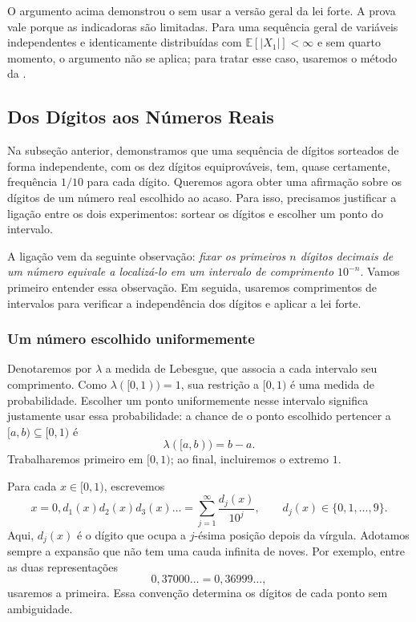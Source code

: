 \documentclass[12pt,portuguese]{article}
\theoremstyle{definition}
\theoremstyle{plainexercise}
\theoremstyle{starredexercise}
\theoremstyle{definition}
\begin{document}
O argumento acima demonstrou o  sem usar a versão geral da lei
forte. A prova vale porque as indicadoras são limitadas. Para uma sequência
geral de variáveis independentes e identicamente distribuídas com
$\mathbb{E}[|X_1|]<\infty$ e sem quarto momento, o argumento não se aplica;
para tratar esse caso, usaremos o método da
.

\subsection{Dos Dígitos aos Números Reais}\label{subsec:digitos-reais}

Na subseção anterior, demonstramos que uma sequência de dígitos sorteados de
forma independente, com os dez dígitos equiprováveis, tem, quase certamente,
frequência $1/10$ para cada dígito. Queremos agora obter uma afirmação sobre
os dígitos de um número real escolhido ao acaso. Para isso, precisamos
justificar a ligação entre os dois experimentos: sortear os dígitos e
escolher um ponto do intervalo.

A ligação vem da seguinte observação: \emph{fixar os primeiros $n$
dígitos decimais de um número equivale a localizá-lo em um intervalo de
comprimento $10^{-n}$}. Vamos primeiro entender essa observação. Em seguida,
usaremos comprimentos de intervalos para verificar a independência dos
dígitos e aplicar a lei forte.

\subsubsection{Um número escolhido uniformemente}

Denotaremos por $\lambda$ a medida de Lebesgue, que associa a cada intervalo
seu comprimento. Como $\lambda([0,1))=1$, sua restrição a $[0,1)$ é uma medida
de probabilidade. Escolher um ponto uniformemente nesse intervalo significa
justamente usar essa probabilidade: a chance de o ponto escolhido pertencer
a $[a,b)\subseteq[0,1)$ é
\[
\lambda([a,b))=b-a.
\]
Trabalharemos primeiro em $[0,1)$; ao final, incluiremos o extremo $1$.

Para cada $x\in[0,1)$, escrevemos
\[
x=0{,}d_1(x)d_2(x)d_3(x)\ldots
=\sum_{j=1}^{\infty}\frac{d_j(x)}{10^j},
\qquad d_j(x)\in\{0,1,\ldots,9\}.
\]
Aqui, $d_j(x)$ é o dígito que ocupa a $j$-ésima posição depois da vírgula.
Adotamos sempre a expansão que não tem uma cauda infinita de noves. Por
exemplo, entre as duas representações
\[
0{,}37000\ldots=0{,}36999\ldots,
\]
usaremos a primeira. Essa convenção determina os dígitos de cada ponto sem
ambiguidade.
\end{document}
